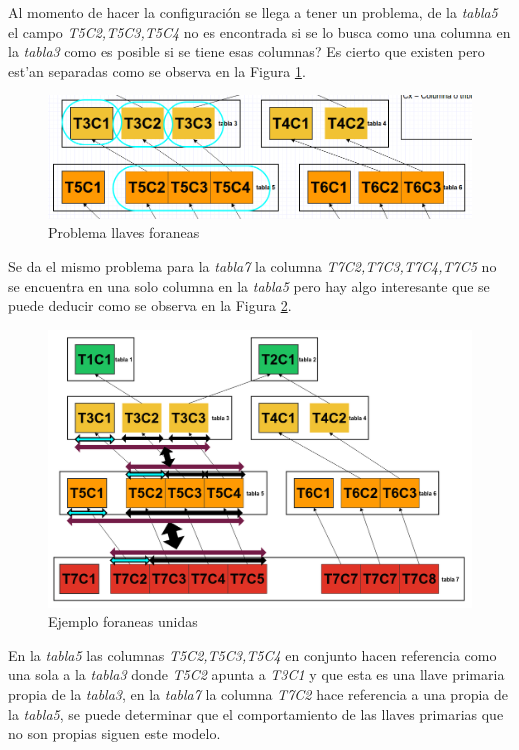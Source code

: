 Al momento de hacer la configuraci\'on se llega a tener un problema, de la \textit{tabla5} el campo  \textit{T5C2,T5C3,T5C4} no es encontrada si se lo busca como una columna en la \textit{tabla3} como es posible si se tiene esas columnas? Es cierto que existen pero est'an separadas como se observa en la Figura \ref{fig:problemaColumnasForaneasLine}.
\begin{figure}[H]
\centering
\includegraphics[scale=0.4]{images/problemaColumnas.png}
\caption{Problema llaves foraneas}\label{fig:problemaColumnasForaneasLine}
\end{figure}
Se da el mismo problema para la \textit{tabla7} la columna \textit{T7C2,T7C3,T7C4,T7C5} no se encuentra en una solo columna en la \textit{tabla5} pero hay algo interesante que se puede deducir como se observa en la Figura \ref{fig:problemaColumnasForaneasGrafica}.
\begin{figure}[H]
\centering
\includegraphics[scale=0.3]{images/problemaForaneas.png}
\caption{Ejemplo foraneas unidas}\label{fig:problemaColumnasForaneasGrafica}
\end{figure}
En la \textit{tabla5} las columnas \textit{T5C2,T5C3,T5C4} en conjunto hacen referencia como una sola a la \textit{tabla3} donde \textit{T5C2} apunta a \textit{T3C1} y que esta es una llave primaria propia de la \textit{tabla3}, en la \textit{tabla7} la columna  \textit{T7C2} hace referencia a una propia de la \textit{tabla5}, se puede determinar que el comportamiento de las llaves primarias que no son propias siguen este modelo.
